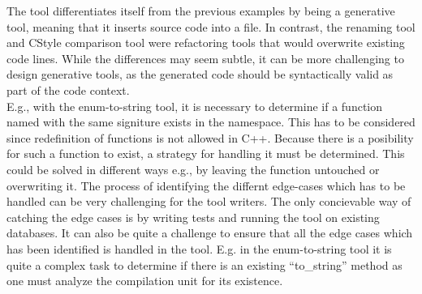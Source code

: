The tool differentiates itself from the previous examples by being a generative tool, meaning that it inserts source code into a file.
In contrast, the renaming tool and CStyle comparison tool were refactoring tools that would overwrite existing code lines.
While the differences may seem subtle, it can be more challenging to design generative tools, as the generated code should be syntactically valid as part of the code context.\\
E.g., with the enum-to-string tool, it is necessary to determine if a function named  with the same signiture exists in the namespace. This has to be considered since redefinition of functions is not allowed in C++.
Because there is a posibility for such a function to exist, a strategy for handling it must be determined. This could be solved in different ways e.g., by leaving the function untouched or overwriting it. The process of identifying the differnt edge-cases which has to be handled can be very challenging for the tool writers. The only concievable way of catching the edge cases is by writing tests and running the tool on existing databases. 
It can also be quite a challenge to ensure that all the edge cases which has been identified is handled in the tool. E.g. in the enum-to-string tool it is quite a complex task to determine if there is an existing ``to\_string'' method as one must analyze the compilation unit for its existence.

